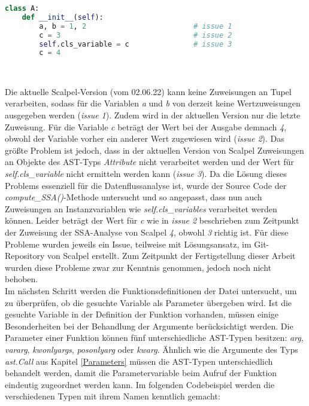 \documentclass[german,bachelor]{swsLeipzig}
\begin{document}
\noindent\begin{minipage}{\linewidth}
\begin{lstlisting}[language=Python, frame=single, basicstyle=\small, label=scalpel_limits, caption={Limitierungen der Datenflussanalyse},captionpos=b]
class A:
    def __init__(self):
        a, b = 1, 2                         # issue 1
        c = 3                               # issue 2
        self.cls_variable = c               # issue 3
        c = 4
\end{lstlisting}
\end{minipage}
\

Die aktuelle Scalpel-Version (vom 02.06.22) kann keine Zuweisungen an Tupel verarbeiten, sodass für die Variablen \textit{a} und \textit{b}
von derzeit keine Wertzuweisungen ausgegeben werden (\textit{issue 1}).
Zudem wird in der aktuellen Version nur die letzte Zuweisung.
Für die Variable \textit{c} beträgt der Wert bei der Ausgabe demnach \textit{4}, obwohl der Variable vorher ein anderer
Wert zugewiesen wird (\textit{issue 2}).
Das größte Problem ist jedoch, dass in der aktuellen Version von Scalpel Zuweisungen an Objekte des AST-Typs \textit{Attribute} nicht verarbeitet werden
und der Wert für \textit{self.cls\_variable} nicht ermitteln werden kann (\textit{issue 3}).
Da die Lösung dieses Problems essenziell für die Datenflussanalyse ist, wurde der Source Code der \textit{compute\_SSA()}-Methode
untersucht und so angepasst, dass nun auch Zuweisungen an Instanzvariablen wie \textit{self.cls\_variables} verarbeitet werden können.
Leider beträgt der Wert für \textit{c} wie in \textit{issue 2} beschrieben zum Zeitpunkt der Zuweisung der SSA-Analyse von Scalpel \textit{4}, obwohl
\textit{3} richtig ist.
Für diese Probleme wurden jeweils ein Issue, teilweise mit Lösungsansatz, im Git-Repository von Scalpel erstellt.
Zum Zeitpunkt der Fertigstellung dieser Arbeit wurden diese Probleme zwar zur Kenntnis genommen, jedoch noch nicht behoben.\\

Im nächsten Schritt werden die Funktionsdefinitionen der Datei untersucht, um zu überprüfen, ob die gesuchte Variable als
Parameter übergeben wird.
Ist die gesuchte Variable in der Definition der Funktion vorhanden, müssen einige Besonderheiten bei der Behandlung der Argumente
berücksichtigt werden.
Die Parameter einer Funktion können fünf unterschiedliche AST-Typen besitzen: \textit{arg}, \textit{vararg}, \textit{kwonlyargs},
\textit{posonlyarg} oder \textit{kwarg}.
Ähnlich wie die Argumente des Typs \textit{ast.Call} aus Kapitel \ref{Parameters} müssen die AST-Typen unterschiedlich behandelt werden, damit die Parametervariable
beim Aufruf der Funktion eindeutig zugeordnet werden kann.
Im folgenden Codebeispiel werden die verschiedenen Typen mit ihrem Namen kenntlich gemacht: \\
\end{document}
